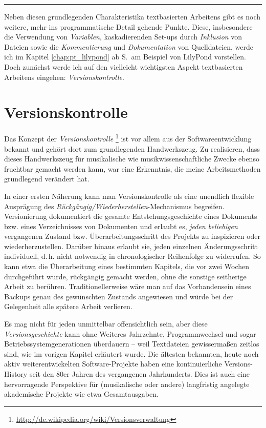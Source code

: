 \documentclass[DIV=12]{scrreprt}
\begin{document}
\bigskip
\hrule
\bigskip

Neben diesen grundlegenden Charakteristika textbasierten Arbeitens gibt es noch weitere, mehr ins programmatische Detail gehende Punkte.
Diese, insbesondere die Verwendung von \emph{Variablen}, kaskadierenden Set-ups durch \emph{Inklusion} von Dateien sowie die \emph{Kommentierung} und \emph{Dokumentation} von Quelldateien, werde ich im Kapitel \ref{chap:pt_lilypond} ab S.\,\pageref{chap:pt_lilypond} am Beispiel von LilyPond vorstellen.
Doch zunächst werde ich auf den vielleicht wichtigsten Aspekt textbasierten Arbeitens eingehen: \emph{Versionskontrolle}.

\chapter{Versionskontrolle} 
\label{chap:pt_version-control}
Das Konzept der \emph{Versionskontrolle}%
\footnote{\url{http://de.wikipedia.org/wiki/Versionsverwaltung}}
ist vor allem aus der Softwareentwicklung bekannt und gehört dort zum grundlegenden Handwerkszeug.
Zu realisieren, dass dieses Handwerkszeug für musikalische wie musikwissenschaftliche Zwecke ebenso fruchtbar gemacht werden kann, war eine Erkenntnis, die meine Arbeitsmethoden grundlegend verändert hat.

In einer ersten Näherung kann man Versionskontrolle als eine unendlich flexible Ausprägung des \emph{Rückgängig/Wiederherstellen}-Mechanismus begreifen.
Versionierung dokumentiert die gesamte Entstehungsgeschichte eines Dokuments bzw. eines Verzeichnisses von Dokumenten und erlaubt es, \emph{jeden beliebigen} vergangenen Zustand bzw. Überarbeitungsschritt des Projekts zu inspizieren oder wiederherzustellen.
Darüber hinaus erlaubt sie, jeden einzelnen Änderungsschritt individuell, d.\,h. nicht notwendig in chronologischer Reihenfolge zu widerrufen.
So kann etwa die Überarbeitung eines bestimmten Kapitels, die vor zwei Wochen durchgeführt wurde, rückgängig gemacht werden, ohne die sonstige seitherige Arbeit zu berühren.
Traditionellerweise wäre man auf das Vorhandensein eines Backups genau des gewünschten Zustands angewiesen und würde bei der Gelegenheit alle spätere Arbeit verlieren.

Es mag nicht für jeden unmittelbar offensichtlich sein, aber diese \emph{Versionsgeschichte} kann ohne Weiteres Jahrzehnte, Programmwechsel und sogar Betriebssystemgenerationen überdauern -- weil Textdateien gewissermaßen zeitlos sind, wie im vorigen Kapitel erläutert wurde.
Die ältesten bekannten, heute noch aktiv weiterentwickelten Software-Projekte haben eine kontinuierliche Versions-History seit den 80er Jahren des vergangenen Jahrhunderts.
Dies ist auch eine hervorragende Perspektive für (musikalische oder andere) langfristig angelegte akademische Projekte wie etwa Gesamtausgaben.
\end{document}
